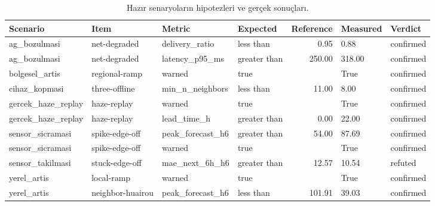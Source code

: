 \begin{table}[t]
\caption{Hazır senaryoların hipotezleri ve gerçek sonuçları.}
\label{tab:scenarios}
\centering\footnotesize
\begin{tabular}{llllrll}
\toprule
Scenario & Item & Metric & Expected & Reference & Measured & Verdict \\
\midrule
ag\_bozulmasi & net-degraded & delivery\_ratio & less than & 0.95 & 0.88 & confirmed \\
ag\_bozulmasi & net-degraded & latency\_p95\_ms & greater than & 250.00 & 318.00 & confirmed \\
bolgesel\_artis & regional-ramp & warned & true &  & True & confirmed \\
cihaz\_kopmasi & three-offline & min\_n\_neighbors & less than & 11.00 & 8.00 & confirmed \\
gercek\_haze\_replay & haze-replay & warned & true &  & True & confirmed \\
gercek\_haze\_replay & haze-replay & lead\_time\_h & greater than & 0.00 & 22.00 & confirmed \\
sensor\_sicramasi & spike-edge-off & peak\_forecast\_h6 & greater than & 54.00 & 87.69 & confirmed \\
sensor\_sicramasi & spike-edge-off & warned & true &  & True & confirmed \\
sensor\_takilmasi & stuck-edge-off & mae\_next\_6h\_h6 & greater than & 12.57 & 10.54 & refuted \\
yerel\_artis & local-ramp & warned & true &  & True & confirmed \\
yerel\_artis & neighbor-huairou & peak\_forecast\_h6 & less than & 101.91 & 39.03 & confirmed \\
\bottomrule
\end{tabular}
\end{table}
